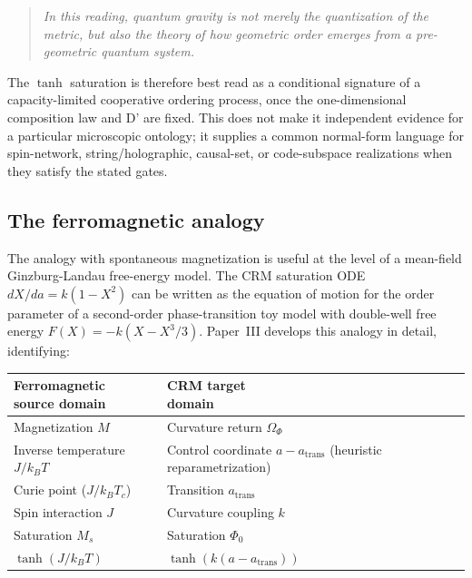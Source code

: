 \documentclass[aps,prd,twocolumn,superscriptaddress,nofootinbib]{revtex4-2}
\begin{document}
\begin{quote}
\textit{In this reading, quantum gravity is not merely the quantization of the metric, but also the theory of how geometric order emerges from a pre-geometric quantum system.}
\end{quote}

The $\tanh$ saturation is therefore best read as a conditional signature of a capacity-limited cooperative ordering process, once the one-dimensional composition law and D' are fixed. This does not make it independent evidence for a particular microscopic ontology; it supplies a common normal-form language for spin-network, string/holographic, causal-set, or code-subspace realizations when they satisfy the stated gates.

\subsection{The ferromagnetic analogy}

The analogy with spontaneous magnetization is useful at the level of a mean-field Ginzburg-Landau free-energy model. The CRM saturation ODE $dX/da = k(1 - X^2)$ can be written as the equation of motion for the order parameter of a second-order phase-transition toy model with double-well free energy $F(X) = -k(X - X^3/3)$. Paper~III \cite{Geiger2026c} develops this analogy in detail, identifying:

\begin{center}
\begin{tabular}{ll}
\hline
\shortstack[l]{Ferromagnetic\\source domain} & \shortstack[l]{CRM target\\domain} \\
\hline
Magnetization $M$ & Curvature return $\Omega_\Phi$ \\
\shortstack[l]{Inverse temperature\\$J/k_BT$} & \shortstack[l]{Control coordinate\\$a-a_{\mathrm{trans}}$\\(heuristic reparametrization)} \\
Curie point ($J/k_BT_c$) & Transition $a_{\mathrm{trans}}$ \\
Spin interaction $J$ & Curvature coupling $k$ \\
Saturation $M_s$ & Saturation $\Phi_0$ \\
$\tanh(J/k_BT)$ & $\tanh(k(a - a_{\mathrm{trans}}))$ \\
\hline
\end{tabular}
\end{center}
\end{document}
